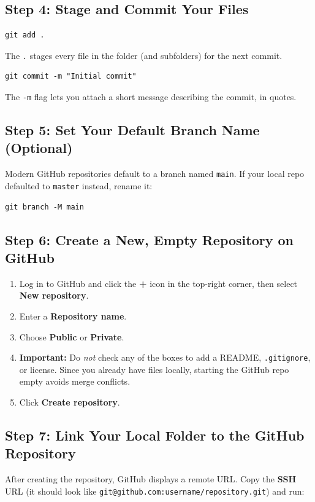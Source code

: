 \documentclass[../main.tex]{subfiles}
\begin{document}
\subsection{Step 4: Stage and Commit Your Files}
\begin{lstlisting}
git add .
\end{lstlisting}

The \texttt{.} stages every file in the folder (and subfolders)
for the next commit.

\begin{lstlisting}
git commit -m "Initial commit"
\end{lstlisting}

The \texttt{-m} flag lets you attach a short message describing
the commit, in quotes.

\subsection{Step 5: Set Your Default Branch Name (Optional)}
Modern GitHub repositories default to a branch named
\texttt{main}. If your local repo defaulted to \texttt{master}
instead, rename it:

\begin{lstlisting}
git branch -M main
\end{lstlisting}

\subsection{Step 6: Create a New, Empty Repository on GitHub}
\begin{enumerate}[leftmargin=*]
    \item Log in to GitHub and click the \textbf{+} icon in the
    top-right corner, then select \textbf{New repository}.
    \item Enter a \textbf{Repository name}.
    \item Choose \textbf{Public} or \textbf{Private}.
    \item \textbf{Important:} Do \emph{not} check any of the boxes
    to add a README, \texttt{.gitignore}, or license. Since you
    already have files locally, starting the GitHub repo empty
    avoids merge conflicts.
    \item Click \textbf{Create repository}.
\end{enumerate}

\subsection{Step 7: Link Your Local Folder to the GitHub Repository}
After creating the repository, GitHub displays a remote URL.
Copy the \textbf{SSH} URL (it should look like
\texttt{git@github.com:username/repository.git}) and run:
\end{document}
